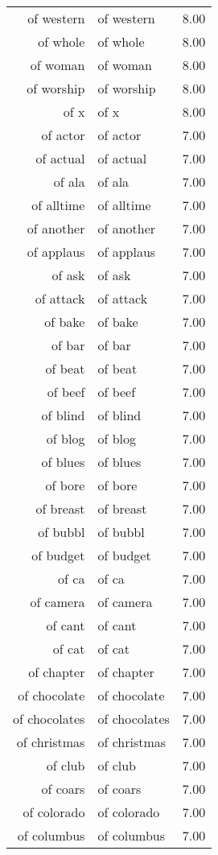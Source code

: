 \begin{table}[ht]
\begin{tabular}{rlr}
  of western & of western & 8.00 \\ 
  of whole & of whole & 8.00 \\ 
  of woman & of woman & 8.00 \\ 
  of worship & of worship & 8.00 \\ 
  of x & of x & 8.00 \\ 
  of actor & of actor & 7.00 \\ 
  of actual & of actual & 7.00 \\ 
  of ala & of ala & 7.00 \\ 
  of alltime & of alltime & 7.00 \\ 
  of another & of another & 7.00 \\ 
  of applaus & of applaus & 7.00 \\ 
  of ask & of ask & 7.00 \\ 
  of attack & of attack & 7.00 \\ 
  of bake & of bake & 7.00 \\ 
  of bar & of bar & 7.00 \\ 
  of beat & of beat & 7.00 \\ 
  of beef & of beef & 7.00 \\ 
  of blind & of blind & 7.00 \\ 
  of blog & of blog & 7.00 \\ 
  of blues & of blues & 7.00 \\ 
  of bore & of bore & 7.00 \\ 
  of breast & of breast & 7.00 \\ 
  of bubbl & of bubbl & 7.00 \\ 
  of budget & of budget & 7.00 \\ 
  of ca & of ca & 7.00 \\ 
  of camera & of camera & 7.00 \\ 
  of cant & of cant & 7.00 \\ 
  of cat & of cat & 7.00 \\ 
  of chapter & of chapter & 7.00 \\ 
  of chocolate & of chocolate & 7.00 \\ 
  of chocolates & of chocolates & 7.00 \\ 
  of christmas & of christmas & 7.00 \\ 
  of club & of club & 7.00 \\ 
  of coars & of coars & 7.00 \\ 
  of colorado & of colorado & 7.00 \\ 
  of columbus & of columbus & 7.00 \\ 

\end{tabular}
\end{table}
